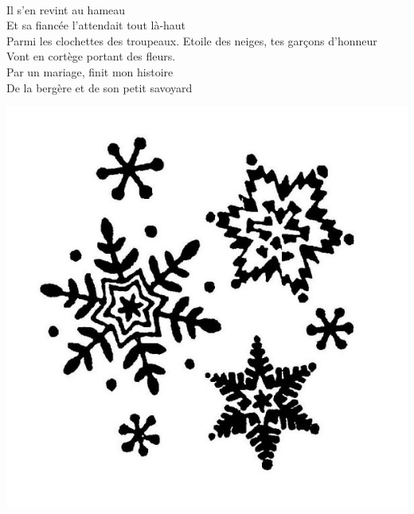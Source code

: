 \\Il s'en revint au hameau
\\Et sa fiancée l'attendait tout là-haut
\\Parmi les clochettes des troupeaux.
\breakpage
Etoile des neiges, tes garçons d'honneur
\\Vont en cortège portant des fleurs.
\\Par un mariage, finit mon histoire
\\De la bergère et de son petit savoyard
\\
\bigskip
\begin{center}
\includegraphics[width=1\textwidth]{images/flocon-de-neige.jpg}
\end{center}

\breakpage